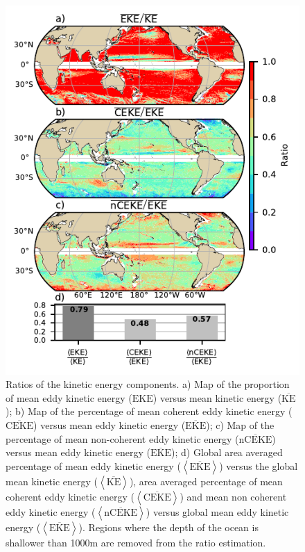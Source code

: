 \documentclass[draft,linenumbers]{agujournal2019}
\newcommand{\MKE}{\overline{\textrm{KE}}}
\newcommand{\MEKE}{\overline{\textrm{EKE}}}
\newcommand{\EKE}{\textrm{EKE}}
\newcommand{\MCEKE}{\overline{\textrm{CEKE}}}
\newcommand{\MnCEKE}{\overline{\textrm{nCEKE}}}
\begin{document}
	\begin{figure}
	    \centering
	    \includegraphics[width=1\textwidth]{figures/eke_ratio_map_easy.pdf}
	    \caption{Ratios of the kinetic energy components. a) Map of the proportion of mean eddy kinetic energy ($\EKE$) versus mean kinetic energy ($\MKE$);
		b) Map of the percentage of mean coherent eddy kinetic energy ($\MCEKE$) versus mean eddy kinetic energy ($\MEKE$);
		c) Map of the percentage of mean non-coherent eddy kinetic energy ($\MnCEKE$) versus mean eddy kinetic energy ($\MEKE$);
		d) Global area averaged percentage of mean eddy kinetic energy ($\left<\MEKE\right>$) versus the global mean kinetic energy ($\left<\MKE\right>$), area averaged percentage of mean coherent eddy kinetic energy ($\left<\MCEKE\right>$) and mean non coherent eddy kinetic energy ($\left<\MnCEKE\right>$) versus global mean eddy kinetic energy ($\left<\MEKE\right>$). Regions where the depth of the ocean is shallower than 1000m are removed from the ratio estimation.
		}
	    \label{fig:eddy_ratio}
	\end{figure}
\end{document}
